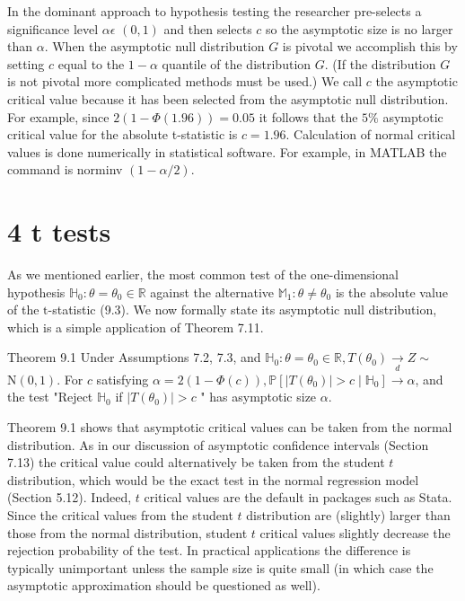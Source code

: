 \documentclass[10pt]{article}
\begin{document}
In the dominant approach to hypothesis testing the researcher pre-selects a significance level $\alpha \epsilon$ $(0,1)$ and then selects $c$ so the asymptotic size is no larger than $\alpha$. When the asymptotic null distribution $G$ is pivotal we accomplish this by setting $c$ equal to the $1-\alpha$ quantile of the distribution $G$. (If the distribution $G$ is not pivotal more complicated methods must be used.) We call $c$ the asymptotic critical value because it has been selected from the asymptotic null distribution. For example, since $2(1-\Phi(1.96))=0.05$ it follows that the $5 \%$ asymptotic critical value for the absolute t-statistic is $c=1.96$. Calculation of normal critical values is done numerically in statistical software. For example, in MATLAB the command is norminv $(1-\alpha / 2)$.

\section{4 t tests}
As we mentioned earlier, the most common test of the one-dimensional hypothesis $\mathbb{H}_{0}: \theta=\theta_{0} \in \mathbb{R}$ against the alternative $\mathbb{M}_{1}: \theta \neq \theta_{0}$ is the absolute value of the $\mathrm{t}$-statistic (9.3). We now formally state its asymptotic null distribution, which is a simple application of Theorem 7.11.

Theorem 9.1 Under Assumptions 7.2, 7.3, and $\mathbb{H}_{0}: \theta=\theta_{0} \in \mathbb{R}, T\left(\theta_{0}\right) \underset{d}{\longrightarrow} Z \sim$ $\mathrm{N}(0,1)$. For $c$ satisfying $\alpha=2(1-\Phi(c)), \mathbb{P}\left[\left|T\left(\theta_{0}\right)\right|>c \mid \mathbb{H}_{0}\right] \rightarrow \alpha$, and the test "Reject $\mathbb{H}_{0}$ if $\left|T\left(\theta_{0}\right)\right|>c$ " has asymptotic size $\alpha$.

Theorem 9.1 shows that asymptotic critical values can be taken from the normal distribution. As in our discussion of asymptotic confidence intervals (Section 7.13) the critical value could alternatively be taken from the student $t$ distribution, which would be the exact test in the normal regression model (Section 5.12). Indeed, $t$ critical values are the default in packages such as Stata. Since the critical values from the student $t$ distribution are (slightly) larger than those from the normal distribution, student $t$ critical values slightly decrease the rejection probability of the test. In practical applications the difference is typically unimportant unless the sample size is quite small (in which case the asymptotic approximation should be questioned as well).
\end{document}
